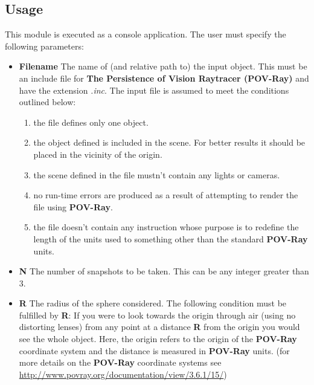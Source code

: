 \documentclass[12pt,a4paper,twoside,openright]{report}
\begin{document}
\subsection{Usage}
This module is executed as a console application. The user must specify the following parameters:
\begin{itemize}
\item \textbf{Filename} The name of (and relative path to) the input object. This must be an include file for \textbf{The Persistence of Vision Raytracer (POV-Ray)} and have the extension \textit{.inc}. The input file is assumed to meet the conditions outlined below:
	\begin{enumerate}
		\item the file defines only one object.
		\item the object defined is included in the scene. For better results it should be placed in the vicinity of the origin.
		\item the scene defined in the file mustn't contain any lights or cameras.
		\item no run-time errors are produced as a result of attempting to render the file using \textbf{POV-Ray}. 
		\item the file doesn't contain any instruction whose purpose is to redefine the length of the units used to something other than the standard \textbf{POV-Ray} units. 
	\end{enumerate}    
\item \textbf{N} The number of snapshots to be taken. This can be any integer greater than 3.
\item \textbf{R} The radius of the sphere considered. The following condition must be fulfilled by \textbf{R}: If you were to look towards the origin through air (using no distorting lenses) from any point at a distance \textbf{R} from the origin you would see the whole object. Here, the origin refers to the origin of the \textbf{POV-Ray} coordinate system and the distance is measured in \textbf{POV-Ray} units.  (for more details on the \textbf{POV-Ray} coordinate systems see \url{http://www.povray.org/documentation/view/3.6.1/15/})
\end{itemize}
\end{document}
